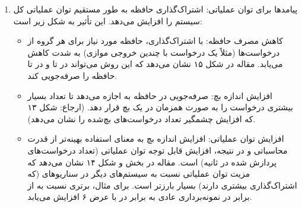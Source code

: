 \documentclass[12pt]{article}
\begin{document}
\begin{enumerate}
\begin{enumerate}
{\begin{enumerate}
\begin{itemize}
                \item شمارش ارجاع: برای هر بلاک فیزیکی یک شمارنده ارجاع نگهداری می‌شود. این شمارنده تعداد دنباله‌های منطقی را که به آن بلاک اشاره می‌کنند، ثبت می‌کند. یک بلاک فیزیکی تنها زمانی آزاد می‌شود که شمارنده ارجاع آن به صفر برسد. (ارجاع: بخش ، زیربخش ).
                \item کپی در زمان نوشتن: زمانی که یک دنباله نیاز به تغییر محتوای یک بلاک مشترک دارد (مثلاً با اضافه کردن یک توکن جدید)،  به جای تغییر بلاک اصلی، یک کپی جدید از آن بلاک ایجاد می‌کند، آن را به دنباله مورد نظر اختصاص می‌دهد و شمارنده ارجاع بلاک اصلی را کاهش می‌دهد. این کار از کپی‌های غیرضروری جلوگیری کرده و تنها در مواقع لزوم انجام می‌شود. (ارجاع: بخش  و شکل ۸).
            \end{itemize}
            \item پیامدها برای توان عملیاتی: اشتراک‌گذاری حافظه به طور مستقیم توان عملیاتی کل سیستم را افزایش می‌دهد. این تأثیر به شکل زیر است:
            \begin{itemize}
                \item کاهش مصرف حافظه: با اشتراک‌گذاری، حافظه مورد نیاز برای هر گروه از درخواست‌ها (مثلاً یک درخواست با چندین خروجی موازی) به شدت کاهش می‌یابد. مقاله در شکل ۱۵ نشان می‌دهد که این روش می‌تواند در  تا  و در  تا  حافظه را صرفه‌جویی کند.
                \item افزایش اندازه بچ: صرفه‌جویی در حافظه به  اجازه می‌دهد تا تعداد بسیار بیشتری درخواست را به صورت همزمان در یک بچ قرار دهد. (ارجاع: شکل ۱۳ که افزایش چشمگیر تعداد درخواست‌های بچ‌شده را نشان می‌دهد).
                \item افزایش توان عملیاتی: افزایش اندازه بچ به معنای استفاده بهینه‌تر از قدرت محاسباتی  و در نتیجه، افزایش قابل توجه توان عملیاتی (تعداد درخواست‌های پردازش شده در ثانیه) است. مقاله در بخش  و شکل ۱۴ نشان می‌دهد که مزیت توان عملیاتی  نسبت به سیستم‌های دیگر در سناریوهای  (که اشتراک‌گذاری بیشتری دارند) بسیار بارزتر است. برای مثال، برتری  نسبت به  از  برابر در نمونه‌برداری عادی به  برابر در  با عرض ۶ افزایش می‌یابد.
            \end{itemize}
        \end{enumerate}}
    \end{enumerate}
    

\end{enumerate}
\end{document}
